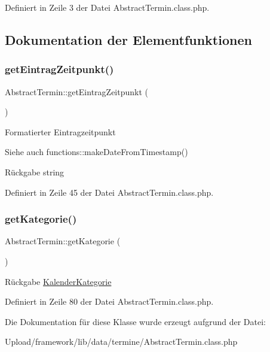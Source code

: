 Definiert in Zeile 3 der Datei Abstract\+Termin.\+class.\+php.



\subsection{Dokumentation der Elementfunktionen}
\mbox{\label{class_abstract_termin_a8fedd7ec0654dd0243bc86821e86e834}} 
\subsubsection{\texorpdfstring{get\+Eintrag\+Zeitpunkt()}{getEintragZeitpunkt()}}
{\footnotesize\ttfamily Abstract\+Termin\+::get\+Eintrag\+Zeitpunkt (\begin{DoxyParamCaption}{ }\end{DoxyParamCaption})}

Formatierter Eintragzeitpunkt \begin{DoxySeeAlso}{Siehe auch}
functions\+::make\+Date\+From\+Timestamp() 
\end{DoxySeeAlso}
\begin{DoxyReturn}{Rückgabe}
string 
\end{DoxyReturn}


Definiert in Zeile 45 der Datei Abstract\+Termin.\+class.\+php.

\mbox{\label{class_abstract_termin_a4b96c13047551fded5f2719eebb948d7}} 
\subsubsection{\texorpdfstring{get\+Kategorie()}{getKategorie()}}
{\footnotesize\ttfamily Abstract\+Termin\+::get\+Kategorie (\begin{DoxyParamCaption}{ }\end{DoxyParamCaption})}

\begin{DoxyReturn}{Rückgabe}
\mbox{\hyperlink{class_kalender_kategorie}{Kalender\+Kategorie}} 
\end{DoxyReturn}


Definiert in Zeile 80 der Datei Abstract\+Termin.\+class.\+php.



Die Dokumentation für diese Klasse wurde erzeugt aufgrund der Datei\+:\begin{DoxyCompactItemize}
\item 
Upload/framework/lib/data/termine/Abstract\+Termin.\+class.\+php\end{DoxyCompactItemize}
